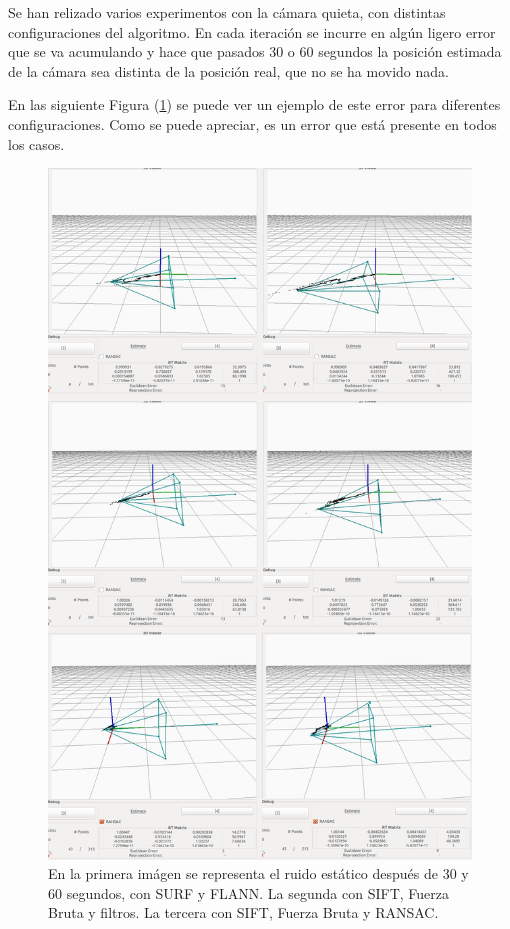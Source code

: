Se han relizado varios experimentos con la cámara quieta, con distintas configuraciones del algoritmo. En cada iteración se incurre en algún ligero error que se va acumulando y hace que pasados 30 o 60 segundos la posición estimada de la cámara sea distinta de la posición real, que no se ha movido nada.

En las siguiente Figura (\ref{fig:static}) se puede ver un ejemplo de este error para diferentes configuraciones. Como se puede apreciar, es un error que está presente en todos los casos.

\begin{figure}[th]
\centering
\includegraphics[scale=0.30]{Figures/tests/static.png}
\decoRule
\caption[Capturas con ruido estático]{En la primera imágen se representa el ruido estático después de 30 y 60 segundos, con SURF y FLANN. La segunda con SIFT, Fuerza Bruta y filtros. La tercera con SIFT, Fuerza Bruta y RANSAC.}
\label{fig:static}
\end{figure}

